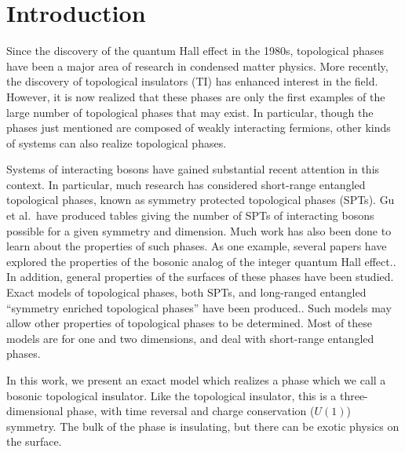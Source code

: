 \documentclass[prb,twocolumn]{revtex4}
\begin{document}
\title{}
\date{\today}
\pacs{}

\author{Scott D. Geraedts}
\author{Olexei I. Motrunich}

\begin{abstract}
\end{abstract}
\maketitle

\section{Introduction}
Since the discovery of the quantum Hall effect in the 1980s,\cite{vonKlitzing} topological phases have been a major area of research in condensed matter physics. More recently, the discovery of topological insulators (TI)\cite{HasanKane,QiZhang} has enhanced interest in the field. However, it is now realized that these phases are only the first examples of the large number of topological phases that may exist.\cite{WenSPT} In particular, though the phases just mentioned are composed of weakly interacting fermions, other kinds of systems can also realize topological phases. 

Systems of interacting bosons have gained substantial recent attention in this context. In particular, much research has considered short-range entangled topological phases, known as symmetry protected topological phases (SPTs). Gu et al.\cite{WenSPT}~have produced tables giving the number of SPTs of interacting bosons possible for a given symmetry and dimension. Much work has also been done to learn about the properties of such phases. As one example, several papers have explored the properties of the bosonic analog of the integer quantum Hall effect.\cite{Senthil,Vishwanath,FQHE}. In addition, general properties of the surfaces of these phases have been studied. Exact models of topological phases, both SPTs, and long-ranged entangled ``symmetry enriched topological phases'' have been produced.\cite{FQHE}. Such models may allow other properties of topological phases to be determined. Most of these models are for one and two dimensions, and deal with short-range entangled phases.

In this work, we present an exact model which realizes a phase which we call a bosonic topological insulator. Like the topological insulator, this is a three-dimensional phase, with time reversal and charge conservation ($U(1)$) symmetry. The bulk of the phase is insulating, but there can be exotic physics on the surface. 
\end{document}
